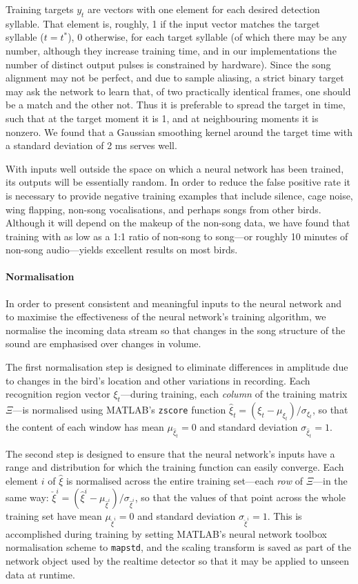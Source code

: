 \documentclass[10pt,letterpaper]{article}
\renewcommand{\subsubsection}[1]{\paragraph{#1}}
\begin{document}
Training targets $y_t$ are vectors with one element for each desired
detection syllable.  That element is, roughly, 1 if the input vector
matches the target syllable ($t=t^*$), 0 otherwise, for each target
syllable (of which there may be any number, although they increase
training time, and in our implementations the number of distinct
output pulses is constrained by hardware).  Since the song alignment
may not be perfect, and due to sample aliasing, a
strict binary target may ask the network to learn that, of two
practically identical frames, one should be a match and the other
not. Thus it is preferable to spread the target in time, such that at
the target moment it is 1, and at neighbouring moments it is
nonzero. We found that a Gaussian smoothing kernel around the target
time with a standard deviation of 2 ms serves well.

With inputs well outside the space on which a neural network has been
trained, its outputs will be essentially random. In order to reduce
the false positive rate it is necessary to provide negative training
examples that include silence, cage noise, wing flapping, non-song
vocalisations, and perhaps songs from other birds.  Although it will
depend on the makeup of the non-song data, we have found that training
with as low as a 1:1 ratio of non-song to song---or roughly 10
minutes of non-song audio---yields excellent results on most birds.


\subsubsection{Normalisation}

In order to present consistent and meaningful inputs to the neural
network and to maximise the effectiveness of the neural network's training
algorithm, we normalise the incoming data stream so that changes in the
song structure of the sound are emphasised over changes in volume.

The first normalisation step is designed to eliminate differences in
amplitude due to changes in the bird's location and other variations
in recording.  Each recognition region vector $\xi_t$---during
training, each {\em column} of the training matrix $\Xi$---is
normalised using MATLAB's {\tt zscore} function $\hat{\xi}_t = (\xi_t
- \mu_{\xi_t}) / \sigma_{\xi_t}$, so that the content of each window
has mean $\mu_{\hat{\xi}_t}=0$ and standard deviation
$\sigma_{\hat{\xi}_t}=1$.

The second step is designed to ensure that the neural network's inputs
have a range and distribution for which the training function can
easily converge.  Each element $i$ of $\hat{\xi}$ is normalised across
the entire training set---each {\em row} of $\Xi$---in the same way:
$\check{\xi}^i = (\hat{\xi}^i -
\mu_{\hat{\xi}^i})/\sigma_{\hat{\xi}^i}$, so that the values of that
point across the whole training set have mean $\mu_{\check{\xi}^i}=0$
and standard deviation $\sigma_{\check{\xi}^i}=1$.  This is
accomplished during training by setting MATLAB's neural network
toolbox normalisation scheme to {\tt mapstd}, and the scaling
transform is saved as part of the network object used by the realtime
detector so that it may be applied to unseen data at runtime.
\end{document}
